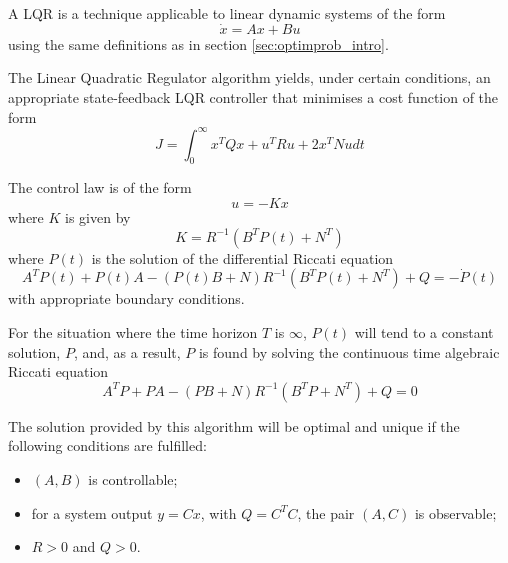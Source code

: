 \par A \acl{LQR} is a technique applicable to linear dynamic systems of the form
\begin{equation}
    \label{eq:dynamic_system}
    \dot{x} = A x + B u
\end{equation}
using the same definitions as in section \ref{sec:optimprob_intro}.

\par The Linear Quadratic Regulator algorithm yields, under certain conditions, an appropriate state-feedback LQR controller that minimises a cost function of the form
\begin{equation}
    \label{eq:quadratic_cost}
    J = \int_0^\infty x^T Q x + u^T R u + 2x^T N u dt
\end{equation}

\par The control law is of the form
\begin{equation}
    \label{eq:feedback}
    u = -Kx
\end{equation}
where $K$ is given by
\begin{equation}
    \label{eq:k_expression}
    K = R^{-1} (B^T P(t) + N^T)
\end{equation}
where $P(t)$ is the solution of the differential Riccati equation \cite{riccati1724animadversiones}
\begin{equation}
    \label{eq:p_diff_expression}
    A^T P(t) + P(t) A - (P(t) B + N) R^{-1} (B^T P(t) + N^T) + Q = - \dot{P}(t)
\end{equation}
with appropriate boundary conditions.

\par For the situation where the time horizon $T$ is $\infty$, $P(t)$ will tend to a constant solution, $P$, and, as a result, $P$ is found by solving the continuous time algebraic Riccati equation 
\begin{equation}
    \label{eq:p_expression}
    A^T P + PA - (PB + N) R^{-1} (B^T P + N^T) + Q = 0
\end{equation}


\par The solution provided by this algorithm will be optimal and unique if the following conditions are fulfilled:
\begin{itemize}
    \item $(A,B)$ is controllable;
    \item for a system output $y = C x$, with $Q=C^T C$, the pair $(A,C)$ is observable;
    \item $R>0$ and $Q>0$.
\end{itemize}

